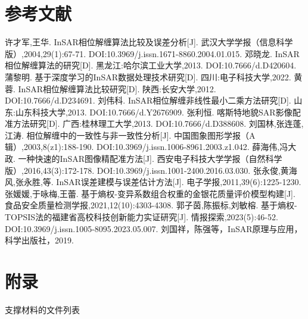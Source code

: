 \documentclass[a4paper]{article}
\begin{document}
	\section{参考文献}
	\vspace{-2em} %
	\begin{thebibliography}{9}  
		 许才军,王华. InSAR相位解缠算法比较及误差分析[J]. 武汉大学学报（信息科学版）,2004,29(1):67-71. DOI:10.3969/j.issn.1671-8860.2004.01.015.
		 邓晓龙. InSAR相位解缠算法的研究[D]. 黑龙江:哈尔滨工业大学,2013. DOI:10.7666/d.D420604.
		 蒲黎明. 基于深度学习的InSAR数据处理技术研究[D]. 四川:电子科技大学,2022.
		 黄蓉. InSAR相位解缠算法比较研究[D]. 陕西:长安大学,2012. DOI:10.7666/d.D234691.
		 刘伟科. InSAR相位解缠非线性最小二乘方法研究[D]. 山东:山东科技大学,2013. DOI:10.7666/d.Y2676909.
		 张利恒. 喀斯特地貌SAR影像配准方法研究[D]. 广西:桂林理工大学,2013. DOI:10.7666/d.D388608.
		 刘国林,张连蓬,江涛. 相位解缠中的一致性与非一致性分析[J]. 中国图象图形学报（A辑）,2003,8(z1):188-190. DOI:10.3969/j.issn.1006-8961.2003.z1.042.
		 薛海伟,冯大政. 一种快速的InSAR图像精配准方法[J]. 西安电子科技大学学报（自然科学版）,2016,43(3):172-178. DOI:10.3969/j.issn.1001-2400.2016.03.030.
		 张永俊,黄海风,张永胜,等. InSAR误差建模与误差估计方法[J]. 电子学报,2011,39(6):1225-1230.
		 张媛媛,于咏梅,王蕾. 基于熵权-变异系数组合权重的金银花质量评价模型构建[J]. 食品安全质量检测学报,2021,12(10):4303-4308.
		 郭子茵,陈振标,刘敏榕. 基于熵权-TOPSIS法的福建省高校科技创新能力实证研究[J]. 情报探索,2023(5):46-52. DOI:10.3969/j.issn.1005-8095.2023.05.007.
		 刘国祥，陈强等，InSAR原理与应用，科学出版社，2019.
	\end{thebibliography}
	
	\newpage
	\section*{附录}

	支撑材料的文件列表
	
\end{document}
